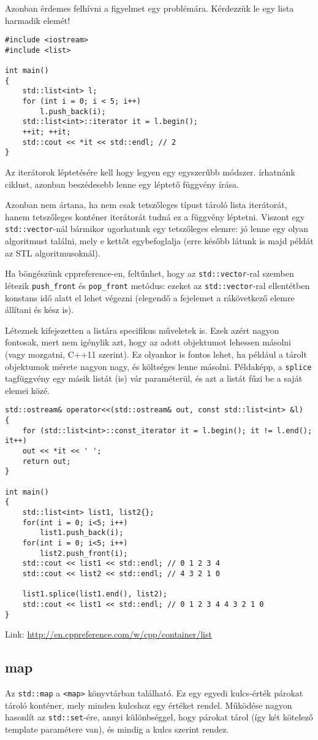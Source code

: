 \documentclass[a4paper,11.5pt,table]{article}
\begin{document}
	Azonban érdemes felhívni a figyelmet egy problémára. Kérdezzük le egy lista harmadik elemét!
	\begin{lstlisting}
#include <iostream>
#include <list>

int main()
{
	std::list<int> l;
	for (int i = 0; i < 5; i++)
		l.push_back(i);
	std::list<int>::iterator it = l.begin();
	++it; ++it;
	std::cout << *it << std::endl; // 2
}
	\end{lstlisting}	
	Az iterátorok léptetésére kell hogy legyen egy egyszerűbb módszer. írhatnánk ciklust, azonban beszédesebb lenne egy léptető függvény írása.
	
	Azonban nem ártana, ha nem csak tetszőleges típust tároló lista iterátorát, hanem tetszőleges konténer iterátorát tudná ez a függvény léptetni. Viszont egy \texttt{std::vector}-nál bármikor ugorhatunk egy tetszőleges elemre: jó lenne egy olyan algoritmust találni, mely e kettőt egybefoglalja (erre később látunk is majd példát az STL algoritmusoknál).
	
	\medskip
	Ha böngészünk cppreference-en, feltűnhet, hogy az \texttt{std::vector}-ral szemben létezik \texttt{push\_front} és \texttt{pop\_front} metódus: ezeket az \texttt{std::vector}-ral ellentétben konstans idő alatt el lehet végezni (elegendő a fejelemet a rákövetkező elemre állítani és kész is).
	\medskip
	
	Léteznek kifejezetten a listára specifikus műveletek is. Ezek azért nagyon fontosak, mert nem igénylik azt, hogy az adott objektumot lehessen másolni (vagy mozgatni, C++11 szerint). Ez olyankor is fontos lehet, ha például a tárolt objektumok mérete nagyon nagy, és költséges lenne másolni. Példaképp, a \texttt{splice} tagfüggvény egy másik listát (is) vár paraméterül, és azt a listát fűzi be a saját elemei közé.
\begin{lstlisting}
std::ostream& operator<<(std::ostream& out, const std::list<int> &l)
{
	for (std::list<int>::const_iterator it = l.begin(); it != l.end(); it++)
	out << *it << ' ';
	return out;
}	

int main()
{
	std::list<int> list1, list2{};
	for(int i = 0; i<5; i++)
		list1.push_back(i); 
	for(int i = 0; i<5; i++)
		list2.push_front(i);
	std::cout << list1 << std::endl; // 0 1 2 3 4
	std::cout << list2 << std::endl; // 4 3 2 1 0 
	
	list1.splice(list1.end(), list2);
	std::cout << list1 << std::endl; // 0 1 2 3 4 4 3 2 1 0
}
\end{lstlisting}
	Link: \url{http://en.cppreference.com/w/cpp/container/list}
	\subsection{map}
	Az \texttt{std::map} a \texttt{<map>} könyvtárban található. Ez egy egyedi kulcs-érték párokat tároló konténer, mely minden kulcshoz egy értéket rendel. Működése nagyon hasonlít az \texttt{std::set}-ére, annyi különbséggel, hogy párokat tárol (így két kötelező template paramétere van), és mindig a kulcs szerint rendez.
	\smallskip
	
\end{document}
